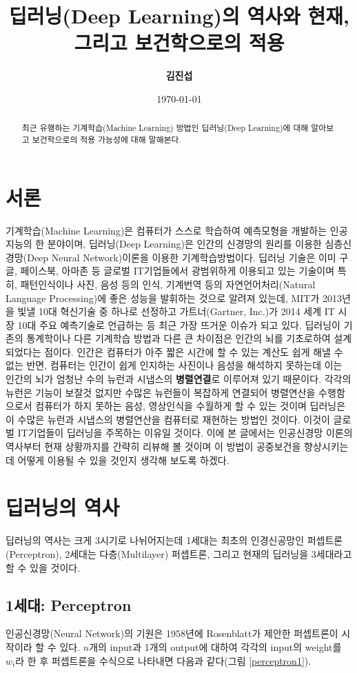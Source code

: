 \documentclass[10pt]{article}
\title{\textbf{딥러닝(Deep Learning)의 역사와 현재, 그리고 보건학으로의 적용}}
\author{
        \textbf{김진섭}            
}
\date{\today}
\begin{document}
\maketitle

\begin{abstract}
최근 유행하는 기계학습(Machine Learning) 방법인 딥러닝(Deep Learning)에 대해 알아보고 보건학으로의 적용 가능성에 대해 말해본다. 
\end{abstract}

\section{서론} %
\noindent 기계학습(Machine Learning)은 컴퓨터가 스스로 학습하여 예측모형을 개발하는 인공지능의 한 분야이며,  딥러닝(Deep Learning)은 인간의 신경망의 원리를 이용한 심층신경망(Deep Neural Network)이론을 이용한 기계학습방법이다. 딥러닝 기술은 이미 구글, 페이스북, 아마존 등 글로벌 IT기업들에서 광범위하게 이용되고 있는 기술이며 특히, 패턴인식이나 사진, 음성 등의 인식, 기계번역 등의 자연언어처리(Natural Language Processing)에 좋은 성능을 발휘하는 것으로 알려져 있는데,  MIT가 2013년을 빛낼 10대 혁신기술 중 하나로 선정하고 가트너(Gartner, Inc.)가 2014 세계 IT 시장 10대 주요 예측기술로 언급하는 등 최근 가장 뜨거운 이슈가 되고 있다\cite{mitnews,gartnernews}. 딥러닝이 기존의 통계학이나 다른 기계학습 방법과 다른 큰 차이점은 인간의 뇌를 기초로하여 설계되었다는 점이다. 인간은 컴퓨터가 아주 짧은 시간에 할 수 있는 계산도 쉽게 해낼 수 없는 반면, 컴퓨터는 인간이 쉽게 인지하는 사진이나 음성을 해석하지 못하는데 이는 인간의 뇌가 엄청난 수의 뉴런과 시냅스의 \textbf{병렬연결}로 이루어져 있기 때문이다. 각각의 뉴런은 기능이 보잘것 없지만 수많은 뉴런들이 복잡하게 연결되어 병렬연산을 수행함으로서 컴퓨터가 하지 못하는 음성, 영상인식을 수월하게 할 수 있는 것이며 딥러닝은 이 수많은 뉴런과 시냅스의 병렬연산을 컴퓨터로 재현하는 방법인 것이다. 이것이 글로벌 IT기업들이 딥러닝을 주목하는 이유일 것이다. 이에 본 글에서는 인공신경망 이론의 역사부터 현재 상황까지를 간략히 리뷰해 볼 것이며 이 방법이 공중보건을 향상시키는데 어떻게 이용될 수 있을 것인지 생각해 보도록 하겠다. 


\section{딥러닝의 역사}
딥러닝의 역사는 크게 3시기로 나뉘어지는데 1세대는 최초의 인경신공망인 퍼셉트론(Perceptron), 2세대는 다층(Multilayer) 퍼셉트론, 그리고 현재의 딥러닝을 3세대라고 할 수 있을 것이다. 


\subsection{1세대: Perceptron}
인공신경망(Neural Network)의 기원은 1958년에 Rosenblatt가 제안한 퍼셉트론이 시작이라 할 수 있다\cite{rosenblatt1958perceptron}. $n$개의 input과 1개의 output에 대하여 각각의 input의 weight를 $w_i$라 한 후 퍼셉트론을 수식으로 나타내면 다음과 같다(그림 \ref{perceptron1})\cite{perceptronfig}.
\end{document}
